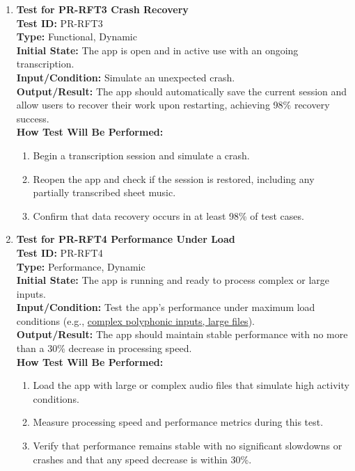 \documentclass[12pt, titlepage]{article}
\begin{document}
\begin{enumerate}
    \item \textbf{Test for PR-RFT3 Crash Recovery} \\
      \newline
      \textbf{Test ID:} PR-RFT3 \\
      \textbf{Type:} Functional, Dynamic \\
      \textbf{Initial State:} The app is open and in active use with an ongoing transcription. \\
      \textbf{Input/Condition:} Simulate an unexpected crash. \\
      \textbf{Output/Result:} The app should automatically save the current session and allow users to recover their work upon restarting, achieving 98\% recovery success. \\
      \textbf{How Test Will Be Performed:}
      \begin{enumerate}
          \item Begin a transcription session and simulate a crash.
          \item Reopen the app and check if the session is restored, including any partially transcribed sheet music.
          \item Confirm that data recovery occurs in at least 98\% of test cases.
      \end{enumerate}
      \item \textbf{Test for PR-RFT4 Performance Under Load} \\
      \newline
      \textbf{Test ID:} PR-RFT4 \\
      \textbf{Type:} Performance, Dynamic \\
      \textbf{Initial State:} The app is running and ready to process complex or large inputs. \\
      \textbf{Input/Condition:} Test the app’s performance under maximum load conditions (e.g., \href{https://github.com/JaakLipp/ScoreGen/tree/main/test/TestingDatasets/piano-samples/sample-chords}{complex polyphonic inputs, large files}). \\
      \textbf{Output/Result:} The app should maintain stable performance with no more than a 30\% decrease in processing speed. \\
      \textbf{How Test Will Be Performed:}
      \begin{enumerate}
          \item Load the app with large or complex audio files that simulate high activity conditions.
          \item Measure processing speed and performance metrics during this test.
          \item Verify that performance remains stable with no significant slowdowns or crashes and that any speed decrease is within 30\%.
      \end{enumerate}


\end{enumerate}
\end{document}
